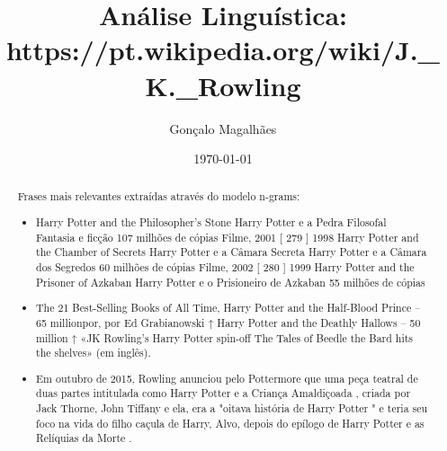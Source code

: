 \documentclass{article}
\title{Análise Linguística: https://pt.wikipedia.org/wiki/J.\_K.\_Rowling}
\author{Gonçalo Magalhães}
\date{\today}
\begin{document}
\maketitle

\begin{abstract}
Frases mais relevantes extraídas através do modelo n-grams:
\begin{itemize}
\item Harry Potter and the Philosopher’s Stone Harry Potter e a Pedra Filosofal Fantasia e ficção 107 milhões de cópias Filme, 2001 [ 279 ] 1998 Harry Potter and the Chamber of Secrets Harry Potter e a Câmara Secreta Harry Potter e a Câmara dos Segredos 60 milhões de cópias Filme, 2002 [ 280 ] 1999 Harry Potter and the Prisoner of Azkaban Harry Potter e o Prisioneiro de Azkaban 55 milhões de cópias
\item The 21 Best-Selling Books of All Time, Harry Potter and the Half-Blood Prince – 65 millionpor, por Ed Grabianowski ↑ Harry Potter and the Deathly Hallows – 50 million ↑ «JK Rowling's Harry Potter spin-off The Tales of Beedle the Bard hits the shelves» (em inglês).
\item Em outubro de 2015, Rowling anunciou pelo Pottermore que uma peça teatral de duas partes intitulada como Harry Potter e a Criança Amaldiçoada , criada por Jack Thorne, John Tiffany e ela, era a "oitava história de Harry Potter " e teria seu foco na vida do filho caçula de Harry, Alvo, depois do epílogo de Harry Potter e as Relíquias da Morte .
\end{itemize}
\end{abstract}
\end{document}
